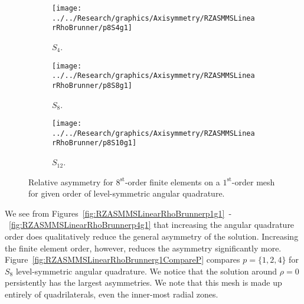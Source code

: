 \documentclass[12pt]{article}
\begin{document}
\begin{sidewaysfigure}[!htb]
\centering
\begin{subfigure}{0.33\textwidth}
\texttt{[image: ../../Research/graphics/Axisymmetry/RZASMMSLinearRhoBrunner/p8S4g1]}
\caption{$S_4$.}
\end{subfigure}%
\begin{subfigure}{0.33\textwidth}
\texttt{[image: ../../Research/graphics/Axisymmetry/RZASMMSLinearRhoBrunner/p8S8g1]}
\caption{$S_8$.}
\end{subfigure}%
\begin{subfigure}{0.33\textwidth}
\texttt{[image: ../../Research/graphics/Axisymmetry/RZASMMSLinearRhoBrunner/p8S10g1]}
\caption{$S_{12}$.}
\end{subfigure}
\caption{Relative asymmetry for $8^\text{st}$-order finite elements on a $1^\text{st}$-order mesh for given order of level-symmetric angular quadrature.}
\label{fig:RZASMMSLinearRhoBrunnerp8g1}
\end{sidewaysfigure}

We see from Figures~\ref{fig:RZASMMSLinearRhoBrunnerp1g1}~-~\ref{fig:RZASMMSLinearRhoBrunnerp4g1} that increasing the angular quadrature order does qualitatively reduce the general asymmetry of the solution. Increasing the finite element order, however, reduces the asymmetry significantly more. Figure~\ref{fig:RZASMMSLinearRhoBrunnerg1CompareP} compares $p=\{1,2,4\}$ for $S_8$ level-symmetric angular quadrature. We notice that the solution around $\rho=0$ persistently has the largest asymmetries. We note that this mesh is made up entirely of quadrilaterals, even the inner-most radial zones.
\end{document}
